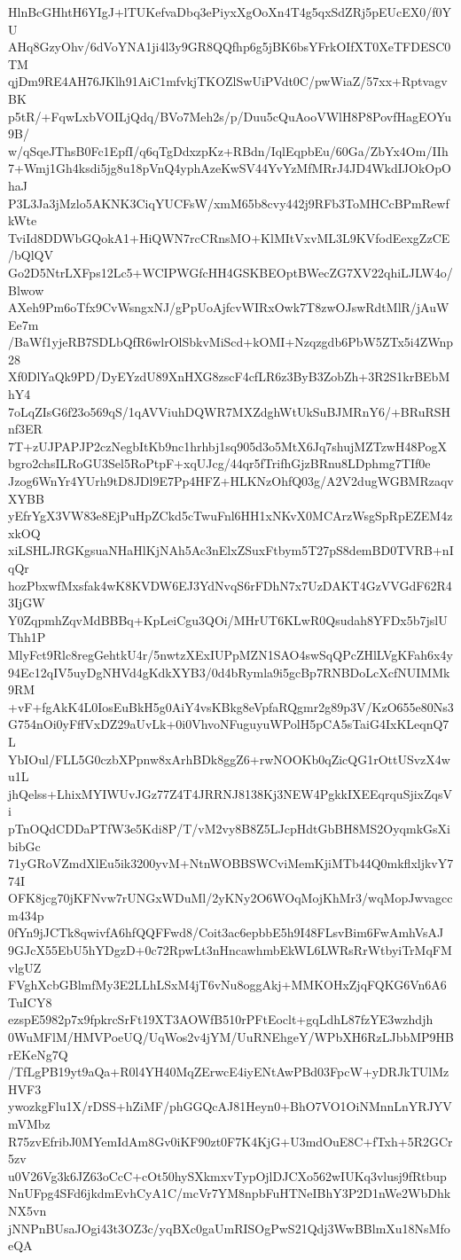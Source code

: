 HlnBcGHhtH6YIgJ+lTUKefvaDbq3ePiyxXgOoXn4T4g5qxSdZRj5pEUcEX0/f0YU
AHq8GzyOhv/6dVoYNA1ji4l3y9GR8QQfhp6g5jBK6bsYFrkOIfXT0XeTFDESC0TM
qjDm9RE4AH76JKlh91AiC1mfvkjTKOZlSwUiPVdt0C/pwWiaZ/57xx+RptvagvBK
p5tR/+FqwLxbVOILjQdq/BVo7Meh2s/p/Duu5cQuAooVWlH8P8PovfHagEOYu9B/
w/qSqeJThsB0Fc1EpfI/q6qTgDdxzpKz+RBdn/IqlEqpbEu/60Ga/ZbYx4Om/IIh
7+Wmj1Gh4ksdi5jg8u18pVnQ4yphAzeKwSV44YvYzMfMRrJ4JD4WkdIJOkOpOhaJ
P3L3Ja3jMzlo5AKNK3CiqYUCFsW/xmM65b8cvy442j9RFb3ToMHCcBPmRewfkWte
TviId8DDWbGQokA1+HiQWN7rcCRnsMO+KlMItVxvML3L9KVfodEexgZzCE/bQlQV
Go2D5NtrLXFps12Lc5+WCIPWGfcHH4GSKBEOptBWecZG7XV22qhiLJLW4o/Blwow
AXeh9Pm6oTfx9CvWsngxNJ/gPpUoAjfcvWIRxOwk7T8zwOJswRdtMlR/jAuWEe7m
/BaWf1yjeRB7SDLbQfR6wlrOlSbkvMiScd+kOMI+Nzqzgdb6PbW5ZTx5i4ZWnp28
Xf0DlYaQk9PD/DyEYzdU89XnHXG8zscF4cfLR6z3ByB3ZobZh+3R2S1krBEbMhY4
7oLqZIsG6f23o569qS/1qAVViuhDQWR7MXZdghWtUkSuBJMRnY6/+BRuRSHnf3ER
7T+zUJPAPJP2czNegbItKb9nc1hrhbj1sq905d3o5MtX6Jq7shujMZTzwH48PogX
bgro2chsILRoGU3Sel5RoPtpF+xqUJcg/44qr5fTrifhGjzBRnu8LDphmg7TIf0e
Jzog6WnYr4YUrh9tD8JDl9E7Pp4HFZ+HLKNzOhfQ03g/A2V2dugWGBMRzaqvXYBB
yEfrYgX3VW83e8EjPuHpZCkd5cTwuFnl6HH1xNKvX0MCArzWsgSpRpEZEM4zxkOQ
xiLSHLJRGKgsuaNHaHlKjNAh5Ac3nElxZSuxFtbym5T27pS8demBD0TVRB+nIqQr
hozPbxwfMxsfak4wK8KVDW6EJ3YdNvqS6rFDhN7x7UzDAKT4GzVVGdF62R43IjGW
Y0ZqpmhZqvMdBBBq+KpLeiCgu3QOi/MHrUT6KLwR0Qsudah8YFDx5b7jslUThh1P
MlyFct9Rlc8regGehtkU4r/5nwtzXExIUPpMZN1SAO4swSqQPcZHlLVgKFah6x4y
94Ec12qIV5uyDgNHVd4gKdkXYB3/0d4bRymla9i5gcBp7RNBDoLcXcfNUIMMk9RM
+vF+fgAkK4L0IosEuBkH5g0AiY4vsKBkg8eVpfaRQgmr2g89p3V/KzO655e80Ns3
G754nOi0yFffVxDZ29aUvLk+0i0VhvoNFuguyuWPolH5pCA5sTaiG4IxKLeqnQ7L
YbIOul/FLL5G0czbXPpnw8xArhBDk8ggZ6+rwNOOKb0qZicQG1rOttUSvzX4wu1L
jhQelss+LhixMYIWUvJGz77Z4T4JRRNJ8138Kj3NEW4PgkkIXEEqrquSjixZqsVi
pTnOQdCDDaPTfW3e5Kdi8P/T/vM2vy8B8Z5LJcpHdtGbBH8MS2OyqmkGsXibibGc
71yGRoVZmdXlEu5ik3200yvM+NtnWOBBSWCviMemKjiMTb44Q0mkflxljkvY774I
OFK8jcg70jKFNvw7rUNGxWDuMl/2yKNy2O6WOqMojKhMr3/wqMopJwvagccm434p
0fYn9jJCTk8qwivfA6hfQQFFwd8/Coit3ac6epbbE5h9I48FLsvBim6FwAmhVsAJ
9GJcX55EbU5hYDgzD+0c72RpwLt3nHncawhmbEkWL6LWRsRrWtbyiTrMqFMvlgUZ
FVghXcbGBlmfMy3E2LLhLSxM4jT6vNu8oggAkj+MMKOHxZjqFQKG6Vn6A6TuICY8
ezspE5982p7x9fpkrcSrFt19XT3AOWfB510rPFtEoclt+gqLdhL87fzYE3wzhdjh
0WuMFlM/HMVPoeUQ/UqWos2v4jYM/UuRNEhgeY/WPbXH6RzLJbbMP9HBrEKeNg7Q
/TfLgPB19yt9aQa+R0l4YH40MqZErwcE4iyENtAwPBd03FpcW+yDRJkTUlMzHVF3
ywozkgFlu1X/rDSS+hZiMF/phGGQcAJ81Heyn0+BhO7VO1OiNMnnLnYRJYVmVMbz
R75zvEfribJ0MYemIdAm8Gv0iKF90zt0F7K4KjG+U3mdOuE8C+fTxh+5R2GCr5zv
u0V26Vg3k6JZ63oCcC+cOt50hySXkmxvTypOjlDJCXo562wIUKq3vlusj9fRtbup
NnUFpg4SFd6jkdmEvhCyA1C/mcVr7YM8npbFuHTNeIBhY3P2D1nWe2WbDhkNX5vn
jNNPnBUsaJOgi43t3OZ3c/yqBXc0gaUmRISOgPwS21Qdj3WwBBlmXu18NsMfoeQA
